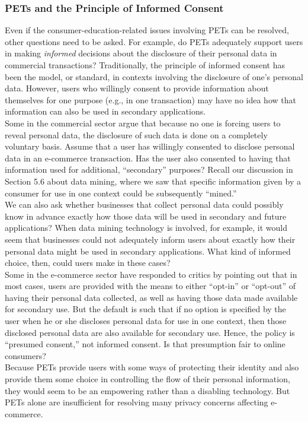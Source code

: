\documentclass[12pt]{article}
\theoremstyle{definition}
\begin{document}
\subsubsection{PETs and the Principle of Informed Consent}
Even if the consumer-education-related issues involving PETs can be resolved, other
questions need to be asked. For example, do PETs adequately support users in making
\textit{informed} decisions about the disclosure of their personal data in commercial transactions?
Traditionally, the principle of informed consent has been the model, or standard,
in contexts involving the disclosure of one’s personal data. However, users who willingly
consent to provide information about themselves for one purpose (e.g., in one transaction)
may have no idea how that information can also be used in secondary applications.\\
Some in the commercial sector argue that because no one is forcing users to reveal
personal data, the disclosure of such data is done on a completely voluntary basis.
Assume that a user has willingly consented to disclose personal data in an e-commerce
transaction. Has the user also consented to having that information used for additional,
“secondary” purposes? Recall our discussion in Section 5.6 about data mining, where we saw that specific information given by a consumer for use in one context could be
subsequently “mined.”\\
We can also ask whether businesses that collect personal data could possibly know
in advance exactly how those data will be used in secondary and future applications?
When data mining technology is involved, for example, it would seem that businesses
could not adequately inform users about exactly how their personal data might be used
in secondary applications. What kind of informed choice, then, could users make in
these cases?\\
Some in the e-commerce sector have responded to critics by pointing out that in most
cases, users are provided with the means to either “opt-in” or “opt-out” of having their
personal data collected, as well as having those data made available for secondary use.
But the default is such that if no option is specified by the user when he or she discloses
personal data for use in one context, then those disclosed personal data are also available
for secondary use. Hence, the policy is “presumed consent,” not informed consent. Is that
presumption fair to online consumers?\\
Because PETs provide users with some ways of protecting their identity and also
provide them some choice in controlling the flow of their personal information, they
would seem to be an empowering rather than a disabling technology. But PETs alone are
insufficient for resolving many privacy concerns affecting e-commerce.
\end{document}
